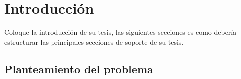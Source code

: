 \chapter{Introducción}
\ifpdf
    \graphicspath{{Introduction/IntroductionFigs/PNG/}{Introduction/IntroductionFigs/PDF/}{Introduction/IntroductionFigs/}}
\else
    \graphicspath{{Introduction/IntroductionFigs/EPS/}{Introduction/IntroductionFigs/}}
\fi

Coloque la introducción de su tesis, las siguientes secciones es como debería estructurar las principales secciones de soporte de su tesis.

\section{Planteamiento del problema}

